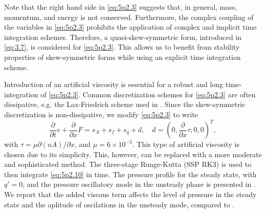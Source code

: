 Note that the right hand side in \eqref{eq:5p2.3} suggests that, in general, mass, momentum, and energy is not conserved. Furthermore, the complex coupling of the variables in \eqref{eq:5p2.3} prohibits the application of complex and implicit time integration schemes. Therefore, a quasi-skew-symmetric form, introduced in \eqref{eq:3.7}, is considered for \eqref{eq:5p2.3}. This allows us to benefit from stability properties of skew-symmetric forms while using an explicit time integration scheme.

Introduction of an artificial viscosity is essential for a robust and long time-integration of \eqref{eq:5p2.3}. Common discretization schemes for \eqref{eq:5p2.3} are often dissipative, e.g. the Lax-Friedrich scheme used in \cite{Wang:255719}. Since the skew-symmetric discretization is non-dissipative, we modify \ref{eq:5p2.3} to write
\begin{equation} \label{eq:5p2.10} 
	\frac{\partial }{\partial t} v + \frac{\partial }{\partial x} F = s_A + s_f + s_q + d, \quad d = (0,\frac{\partial }{\partial x} \tau,0,0)^T,
\end{equation}
with $\tau = \mu \partial (u A)/ \partial x$, and $\mu = 6\times 10^{-5}$. This type of artificial viscosity is chosen due to its simplicity. This, however, can be replaced with a more moderate and sophisticated method. The three-stage Runge-Kutta (SSP RK3) \cite{jiang1996efficient} is used to then integrate \eqref{eq:5p2.10} in time.
The pressure profile for the steady state, with $q'=0$, and the pressure oscillatory mode in the unsteady phase is presented in . We report that the added viscous term affects the level of pressure in the steady state and the aplitude of oscilations in the unsteady mode, compared to \cite{Wang:255719}.


